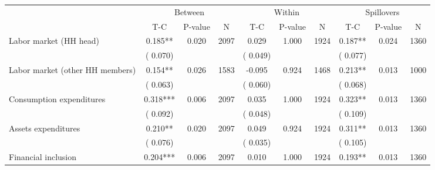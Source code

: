 
\begin{tabular}{l*{9}{c}}\hline&\multicolumn{3}{c}{Between}&\multicolumn{3}{c}{Within}&\multicolumn{3}{c}{Spillovers} \\ \cmidrule(r){2-4}\cmidrule(l){5-7}\cmidrule(l){8-10} & {T-C} & {P-value} & {N} & {T-C} & {P-value} & {N}  & {T-C} & {P-value} & {N}  \\ \midrule
 Labor market (HH head)                 &              0.185**          &        0.020 & 2097          &              0.029          &        1.000 & 1924          &        0.187** &        0.024 & 1360                 \\ 
                               &        (       0.070) & &                                                                 &       (       0.049) & &                                                          &       (       0.077)      & &     \\ 
 Labor market (other HH members)                 &              0.154**          &        0.026 & 1583          &             -0.095 &        0.924 & 1468                   &        0.213** &        0.013 & 1000                 \\ 
                               &        (       0.063) & &                                                                 &       (       0.060) & &                                                          &       (       0.068) & &  \\ 
 Consumption expenditures                 &              0.318***          &        0.006 & 2097          &              0.035 &        1.000 & 1924                   &        0.323** &        0.013 & 1360                 \\ 
                               &        (       0.092) & &                                                                 &       (       0.048) & &                                                          & (       0.109)                                    \\ 
 Assets expenditures                 &              0.210**          &        0.020 & 2097          &              0.049 &        0.924 & 1924                   &        0.311** &        0.013 & 1360                 \\ 
                               &        (       0.076) & &                                                                 &       (       0.035) & &                                                          &       (       0.105) & &   \\ 
 Financial inclusion                 &              0.204***          &        0.006 & 2097          &              0.010 &        1.000 & 1924                   &        0.193** &        0.013 & 1360                 \\ 

\end{tabular}
